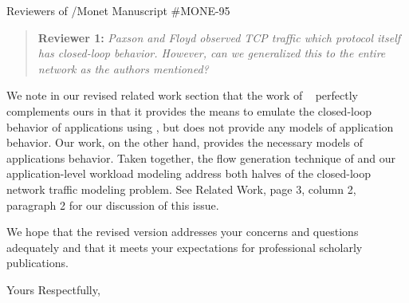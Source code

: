 \documentclass{letter}
\newenvironment{reviewer}[1]%
{\begin{quote}\textbf{Reviewer #1:} \it}{\end{quote}}
\begin{document}
\begin{letter}{Reviewers of /Monet Manuscript \#MONE-95}
\begin{reviewer}{1}
Paxson and Floyd observed TCP traffic which protocol itself has closed-loop behavior. However, can we generalized this to the entire network as the authors mentioned?
\end{reviewer}
We note in our revised related work section that the work of \FHC~\cite{Hernandez06:dissertation} perfectly complements ours in that it provides the means to emulate the closed-loop behavior of applications using , but does not provide any models of application behavior.
Our work, on the other hand, provides the necessary models of applications behavior.
Taken together, the  flow generation technique of \FHC and our application-level workload modeling address both halves of the closed-loop network traffic modeling problem.
See Related Work, page 3, column 2, paragraph 2 for our discussion of this issue.

% 

We hope that the revised version addresses your concerns and questions adequately and that it meets your expectations for professional scholarly publications.

\closing{Yours Respectfully,}

\vfill



\end{letter}
\end{document}
